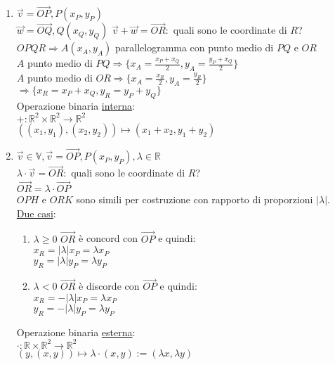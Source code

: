 \documentclass{article}
\newcommand{\ul}[1]{\underline{#1}}
\newcommand{\R}{\mathbb{R}}
\newcommand{\V}{\mathbb{V}}
\begin{document}
	\begin{enumerate}
		\item $\overrightarrow{v}=\overrightarrow{OP},P(x_P,y_P)$\\
		      $\overrightarrow{w}=\overrightarrow{OQ},Q(x_Q,y_Q)$
		      $\overrightarrow{v}+\overrightarrow{w}=\overrightarrow{OR}:$ quali sono le coordinate di $R$?\\
		      $OPQR\Rightarrow A(x_A,y_A)$ parallelogramma con punto medio di $PQ$ e $OR$\\
		      $A$ punto medio di $PQ\Rightarrow\{x_A=\frac{x_P+x_Q}{2},y_A=\frac{y_P+x_Q}{2}\}$\\
		      $A$ punto medio di $OR\Rightarrow\{x_A=\frac{x_R}{2},y_A=\frac{y_R}{2}\}$\\
		      $\Rightarrow\{x_R=x_P+x_Q,y_R=y_P+y_Q\}$\\
		      Operazione binaria \ul{interna}:\\
		      $+:\R^2\times\R^2\rightarrow\R^2$\\
		      $((x_1,y_1),(x_2,y_2))\mapsto(x_1+x_2,y_1+y_2)$
		\item $\overrightarrow{v}\in\V,\overrightarrow{v}=\overrightarrow{OP},P(x_P,y_P),\lambda\in\R$\\
		      $\lambda\cdot\overrightarrow{v}=\overrightarrow{OR}:$ quali sono le coordinate di $R$?\\
		      $\overrightarrow{OR}=\lambda\cdot\overrightarrow{OP}$\\
		      $OPH$ e $ORK$ sono simili per costruzione con rapporto di proporzioni $|\lambda|$.\\
		      \ul{Due casi}:
		      \begin{enumerate}
			      \item $\lambda\ge0$ $\overrightarrow{OR}$ è concord con $\overrightarrow{OP}$ e quindi:\\
			            $x_R=|\lambda|x_P=\lambda x_P$\\
			            $y_R=|\lambda|y_P=\lambda y_P$
			      \item $\lambda<0$ $\overrightarrow{OR}$ è discorde con $\overrightarrow{OP}$ e quindi:\\
			            $x_R=-|\lambda|x_P=\lambda x_P$\\
			            $y_R=-|\lambda|y_P=\lambda y_P$
		      \end{enumerate}
		      Operazione binaria \ul{esterna}:\\
		      $\cdot:\R\times\R^2\rightarrow\R^2$\\
		      \hspace*{0.1em}$(y,(x,y))\mapsto\lambda\cdot(x,y):=(\lambda x,\lambda y)$
	\end{enumerate}
\end{document}
